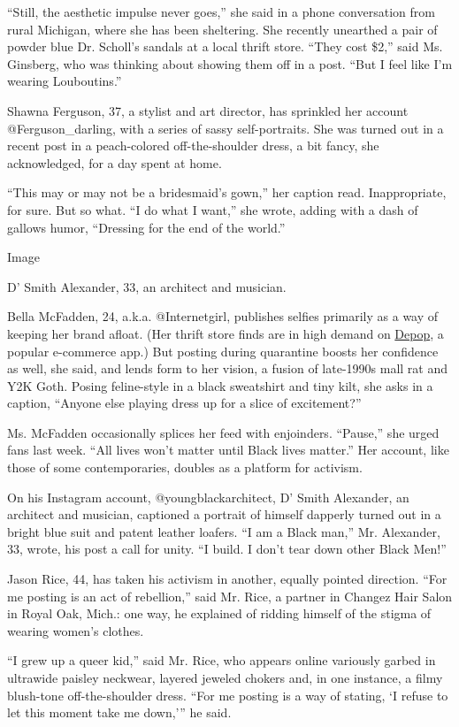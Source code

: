 ``Still, the aesthetic impulse never goes,'' she said in a phone
conversation from rural Michigan, where she has been sheltering. She
recently unearthed a pair of powder blue Dr. Scholl's sandals at a local
thrift store. ``They cost \$2,'' said Ms. Ginsberg, who was thinking
about showing them off in a post. ``But I feel like I'm wearing
Louboutins.''

Shawna Ferguson, 37, a stylist and art director, has sprinkled her
account @Ferguson\_darling, with a series of sassy self-portraits. She
was turned out in a recent post in a peach-colored off-the-shoulder
dress, a bit fancy, she acknowledged, for a day spent at home.

``This may or may not be a bridesmaid's gown,'' her caption read.
Inappropriate, for sure. But so what. ``I do what I want,'' she wrote,
adding with a dash of gallows humor, ``Dressing for the end of the
world.''

Image

D' Smith Alexander, 33, an architect and musician.

Bella McFadden, 24, a.k.a. @Internetgirl, publishes selfies primarily as
a way of keeping her brand afloat. (Her thrift store finds are in high
demand on \href{http://www.depop.com}{Depop}, a popular e-commerce app.)
But posting during quarantine boosts her confidence as well, she said,
and lends form to her vision, a fusion of late-1990s mall rat and Y2K
Goth. Posing feline-style in a black sweatshirt and tiny kilt, she asks
in a caption, ``Anyone else playing dress up for a slice of
excitement?''

Ms. McFadden occasionally splices her feed with enjoinders. ``Pause,''
she urged fans last week. ``All lives won't matter until Black lives
matter.'' Her account, like those of some contemporaries, doubles as a
platform for activism.

On his Instagram account, @youngblackarchitect, D' Smith Alexander, an
architect and musician, captioned a portrait of himself dapperly turned
out in a bright blue suit and patent leather loafers. ``I am a Black
man,'' Mr. Alexander, 33, wrote, his post a call for unity. ``I build. I
don't tear down other Black Men!''

Jason Rice, 44, has taken his activism in another, equally pointed
direction. ``For me posting is an act of rebellion,'' said Mr. Rice, a
partner in Changez Hair Salon in Royal Oak, Mich.: one way, he explained
of ridding himself of the stigma of wearing women's clothes.

``I grew up a queer kid,'' said Mr. Rice, who appears online variously
garbed in ultrawide paisley neckwear, layered jeweled chokers and, in
one instance, a filmy blush-tone off-the-shoulder dress. ``For me
posting is a way of stating, `I refuse to let this moment take me
down,''' he said.

